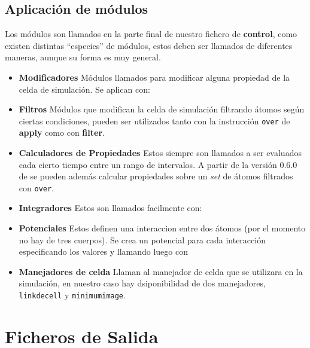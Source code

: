 \subsection{Aplicaci\'on de m\'odulos}

Los m\'odulos son llamados en la parte final de nuestro fichero de
\textbf{control}, como existen distintas ``especies'' de m\'odulos, estos deben
ser llamados de diferentes maneras, aunque su forma es muy general.

\begin{itemize}
 \item \textbf{Modificadores}
  M\'odulos llamados para modificar alguna propiedad de la celda de
simulaci\'on. Se aplican con:
 \item \textbf{Filtros}
  M\'odulos que modifican la celda de simulaci\'on filtrando \'atomos seg\'un
ciertas condiciones, pueden ser  utilizados tanto con la instrucci\'on
\verb|over| de \textbf{apply} como con \textbf{filter}.
 \item \textbf{Calculadores de Propiedades}
  Estos siempre son llamados a ser evaluados cada cierto tiempo entre un rango
de intervalos. A partir de la versi\'on 0.6.0 de {\lpmd} se pueden adem\'as
calcular propiedades sobre un \textit{set} de \'atomos filtrados con
\verb|over|.
 \item \textbf{Integradores}
 Estos son llamados facilmente con:
 \item \textbf{Potenciales}
 Estos definen una interaccion entre dos \'atomos (por el momento no hay de tres
cuerpos). Se crea un potencial para cada interacci\'on especificando los valores
y llamando luego con
 \item \textbf{Manejadores de celda}
 Llaman al manejador de celda que se utilizara en la simulaci\'on, en nuestro
caso hay dsiponibilidad de dos manejadores, \verb|linkdecell| y
\verb|minimumimage|.
\end{itemize}

\section{Ficheros de Salida}

